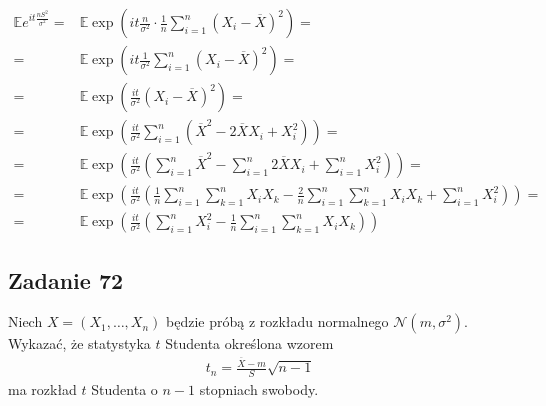 \begin{align*}
\mathbb E e^{it\frac{nS^2}{\sigma^2}}=&
\mathbb E \exp \left(it\frac{n}{\sigma ^2}\cdot\frac{1}{n}\sum_{i=1}^{n}\left(X_i-\overline X\right)^2\right)
=\\=&
\mathbb E \exp \left(it\frac{1}{\sigma ^2}\sum_{i=1}^{n}\left(X_i-\overline X\right)^2\right)
=\\=&
\mathbb E \exp \left(\frac{it}{\sigma ^2}\left(X_i-\overline X\right)^2\right)
=\\=&
\mathbb E \exp \left(\frac{it}{\sigma ^2}\sum_{i=1}^{n}\left(\overline{X}^2-2 \overline{X} X_i+X_i^2\right)\right)
=\\=&
\mathbb E \exp \left(\frac{it}{\sigma ^2}\left(\sum_{i=1}^{n}\overline{X}^2-\sum_{i=1}^{n}2 \overline{X} X_i+\sum_{i=1}^{n}X_i^2\right)\right)
=\\=&
\mathbb E \exp \left(
\frac{it}{\sigma ^2}\left(
\frac{1}{n}\sum_{i=1}^{n}\sum_{k=1}^{n}X_iX_k
-\frac{2}{n}\sum_{i=1}^{n}\sum_{k=1}^{n}X_iX_k
+\sum_{i=1}^{n}X_i^2
\right)\right)
=\\=&
\mathbb E \exp \left(
\frac{it}{\sigma ^2}\left(
\sum_{i=1}^{n}X_i^2
-\frac{1}{n}\sum_{i=1}^{n}\sum_{k=1}^{n}X_iX_k
\right)\right)
\end{align*}



\subsection*{Zadanie 72}
Niech $ X=(X_1,\dots,X_n) $ będzie próbą z rozkładu normalnego $ \mathcal N(m,\sigma^2) $. Wykazać, że statystyka $ t $ Studenta określona wzorem
\begin{gather*}
t_n=\frac{\overline X-m}{S}\sqrt{n-1}
\end{gather*}
ma rozkład $ t $ Studenta o $ n-1 $ stopniach swobody.

